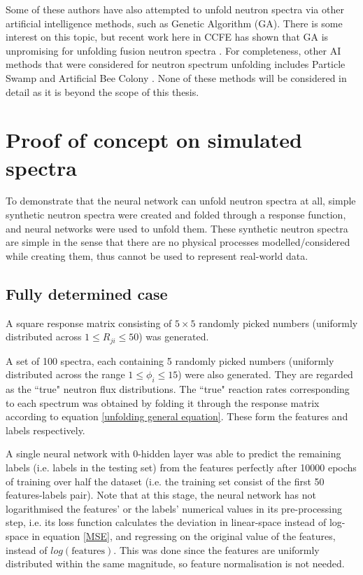 \documentclass[a4paper, 12pt]{article}
\begin{document}
    Some of these authors\cite{ThreeAIUnfolding} have also attempted to unfold neutron spectra via other artificial intelligence methods, such as Genetic Algorithm (GA). There is some interest on this topic\cite{SVitishaGeneticAlgorithm}\cite{HighResGeneticAlgorithm}, but recent work here in CCFE has shown that GA is unpromising for unfolding fusion neutron spectra \cite{R.WorrallThesis}. For completeness, other AI methods that were considered for neutron spectrum unfolding includes Particle Swamp \cite{ParticleSwamp_NE-213} and Artificial Bee Colony \cite{BeeColony}. None of these methods will be considered in detail as it is beyond the scope of this thesis.

\section{Proof of concept on simulated spectra}
To demonstrate that the neural network can unfold neutron spectra at all, simple synthetic neutron spectra were created and folded through a response function, and neural networks were used to unfold them. These synthetic neutron spectra are simple in the sense that there are no physical processes modelled/considered while creating them, thus cannot be used to represent real-world data.

\subsection{Fully determined case}
    A square response matrix consisting of $5\times5$ randomly picked numbers (uniformly distributed across $1\le R_{ji}\le50$) was generated.

    A set of 100 spectra, each containing 5 randomly picked numbers (uniformly distributed across the range $1\le\phi_i\le15$) were also generated. They are regarded as the ``true" neutron flux distributions. The ``true" reaction rates corresponding to each spectrum was obtained by folding it through the response matrix according to equation \ref{unfolding general equation}. These form the features and labels respectively.

    A single neural network with 0-hidden layer was able to predict the remaining labels (i.e. labels in the testing set) from the features perfectly after 10000 epochs of training over half the dataset (i.e. the training set consist of the first 50 features-labels pair). Note that at this stage, the neural network has not logarithmised the features' or the labels' numerical values in its pre-processing step, i.e. its loss function calculates the deviation in linear-space instead of log-space in equation \ref{MSE}, and regressing on the original value of the features, instead of $log(\text{features})$. This was done since the features are uniformly distributed within the same magnitude, so feature normalisation is not needed.
\end{document}

